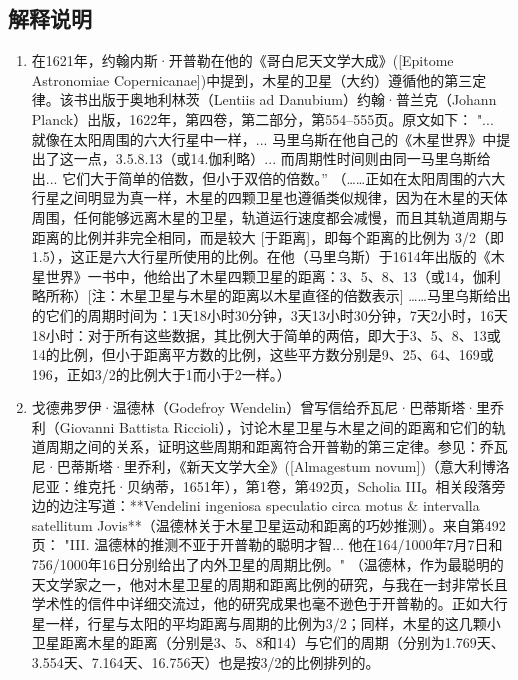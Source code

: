 \subsection{解释说明} 
\begin{enumerate}
\item 在1621年，约翰内斯·开普勒在他的《哥白尼天文学大成》([Epitome Astronomiae Copernicanae])中提到，木星的卫星（大约）遵循他的第三定律。该书出版于奥地利林茨（Lentiis ad Danubium）约翰·普兰克（Johann Planck）出版，1622年，第四卷，第二部分，第554–555页。原文如下：  
"... 就像在太阳周围的六大行星中一样，... 马里乌斯在他自己的《木星世界》中提出了这一点，3.5.8.13（或14.伽利略）... 而周期性时间则由同一马里乌斯给出... 它们大于简单的倍数，但小于双倍的倍数。”  
（……正如在太阳周围的六大行星之间明显为真一样，木星的四颗卫星也遵循类似规律，因为在木星的天体周围，任何能够远离木星的卫星，轨道运行速度都会减慢，而且其轨道周期与距离的比例并非完全相同，而是较大 [于距离]，即每个距离的比例为 3/2（即 1.5），这正是六大行星所使用的比例。在他（马里乌斯）于1614年出版的《木星世界》一书中，他给出了木星四颗卫星的距离：3、5、8、13（或14，伽利略所称）[注：木星卫星与木星的距离以木星直径的倍数表示] ……马里乌斯给出的它们的周期时间为：1天18小时30分钟，3天13小时30分钟，7天2小时，16天18小时：对于所有这些数据，其比例大于简单的两倍，即大于3、5、8、13或14的比例，但小于距离平方数的比例，这些平方数分别是9、25、64、169或196，正如3/2的比例大于1而小于2一样。）  
\item 戈德弗罗伊·温德林（Godefroy Wendelin）曾写信给乔瓦尼·巴蒂斯塔·里乔利（Giovanni Battista Riccioli），讨论木星卫星与木星之间的距离和它们的轨道周期之间的关系，证明这些周期和距离符合开普勒的第三定律。参见：乔瓦尼·巴蒂斯塔·里乔利，《新天文学大全》([Almagestum novum])（意大利博洛尼亚：维克托·贝纳蒂，1651年），第1卷，第492页，Scholia III。相关段落旁边的边注写道：**Vendelini ingeniosa speculatio circa motus & intervalla satellitum Jovis**（温德林关于木星卫星运动和距离的巧妙推测）。来自第492页：  
"III. 温德林的推测不亚于开普勒的聪明才智... 他在164/1000年7月7日和756/1000年16日分别给出了内外卫星的周期比例。"  
（温德林，作为最聪明的天文学家之一，他对木星卫星的周期和距离比例的研究，与我在一封非常长且学术性的信件中详细交流过，他的研究成果也毫不逊色于开普勒的。正如大行星一样，行星与太阳的平均距离与周期的比例为3/2；同样，木星的这几颗小卫星距离木星的距离（分别是3、5、8和14）与它们的周期（分别为1.769天、3.554天、7.164天、16.756天）也是按3/2的比例排列的。
\end{enumerate}
